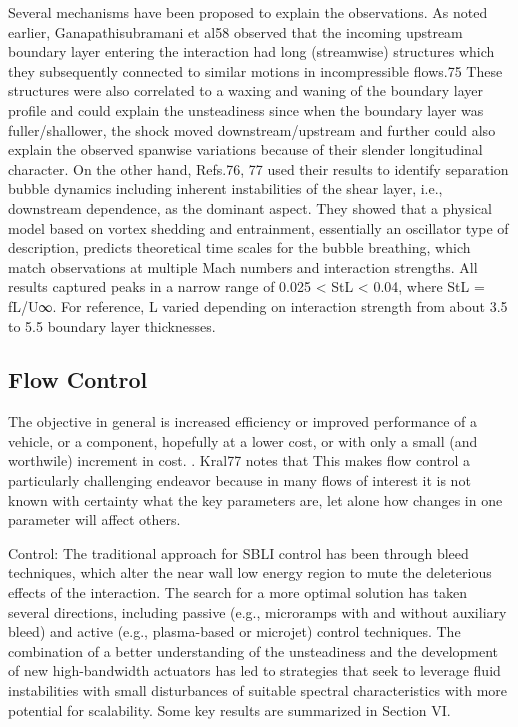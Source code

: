 Several mechanisms have been proposed to explain the observations. As noted earlier, Ganapathisubramani et al58 observed that the incoming upstream boundary layer entering the interaction had long (streamwise) structures which they subsequently connected to similar motions in incompressible flows.75 These structures were also correlated to a waxing and waning of the boundary layer profile and could explain the unsteadiness since when the boundary layer was fuller/shallower, the shock moved downstream/upstream and further could also explain the observed spanwise variations because of their slender longitudinal character. On the other hand, Refs.76, 77 used their results to identify separation bubble dynamics including inherent instabilities of the shear layer, i.e., downstream dependence, as the dominant aspect. They showed that a physical model based on vortex shedding and entrainment, essentially an oscillator type of description, predicts theoretical time scales for the bubble breathing, which match observations at multiple Mach numbers and interaction strengths. All results captured peaks in a narrow range of 0.025 < StL < 0.04, where StL = fL/U∞. For reference, L varied depending on interaction strength from about 3.5 to 5.5 boundary layer thicknesses. \cite{Gaitonde2013}

\subsection{Flow Control}

The objective in general is increased efficiency or improved performance of a vehicle, or a component, hopefully at a lower cost, or with only a small (and worthwile) increment in cost. \cite{Dolling2001}. Kral77 notes that  This makes flow control a particularly challenging endeavor because in many flows of interest it is not known with certainty what the key parameters are, let alone how changes in one parameter will affect others. \cite{Dolling2001}

Control: The traditional approach for SBLI control has been through bleed techniques, which alter the near wall low energy region to mute the deleterious effects of the interaction. The search for a more optimal solution has taken several directions, including passive (e.g., microramps with and without auxiliary bleed) and active (e.g., plasma-based or microjet) control techniques. The combination of a better understanding of the unsteadiness and the development of new high-bandwidth actuators has led to strategies that seek to leverage fluid instabilities with small disturbances of suitable spectral characteristics with more potential for scalability. Some key results are summarized in Section VI. \cite{Gaitonde2013}

